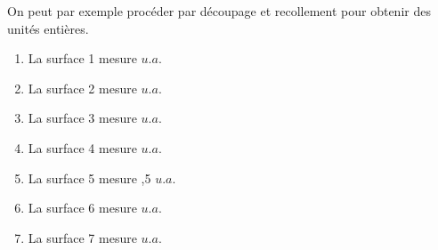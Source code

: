    On peut par exemple procéder par découpage et recollement pour obtenir des unités entières. \\
   \begin{enumerate}
      \item La surface 1 mesure { $u.a.$}
      \item La surface 2 mesure  { $u.a.$}
      \item La surface 3 mesure { $u.a.$}
      \item La surface 4 mesure { $u.a.$}
      \item La surface 5 mesure {,5 $u.a.$}
      \item La surface 6 mesure { $u.a.$}
      \item La surface 7 mesure { $u.a.$}
   \end{enumerate}
